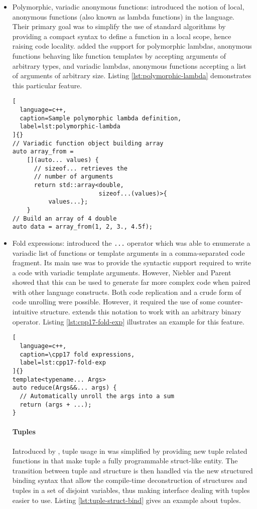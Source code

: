 \documentclass[../main]{subfiles}
\begin{document}
\begin{itemize}
\item
Polymorphic, variadic anonymous functions: 
introduced the notion of local, anonymous functions
(also known as lambda functions) in the language.
Their primary goal was to simplify the use of standard
algorithms by providing a compact syntax to define a
function in a local scope, hence raising code locality.
 added the support for polymorphic lambdas, \ie
anonymous functions behaving like function templates
by accepting arguments of arbitrary types, and variadic
lambdas, \ie anonymous functions accepting a list of
arguments of arbitrary size. Listing \ref{lst:polymorphic-lambda}
demonstrates this particular feature.

\begin{lstlisting}[
  language=c++,
  caption=Sample polymorphic lambda definition,
  label=lst:polymorphic-lambda
]{}
// Variadic function object building array
auto array_from =
    [](auto... values) {
      // sizeof... retrieves the
      // number of arguments
      return std::array<double,
                        sizeof...(values)>{
          values...};
    }
// Build an array of 4 double
auto data = array_from(1, 2, 3., 4.5f);
\end{lstlisting}

\item
Fold expressions:  introduced the \lstinline{...} operator
which was able to enumerate a variadic list of functions
or template arguments in a comma-separated code
fragment. Its main use was to provide the syntactic
support required to write a code with variadic template
arguments. However, Niebler and Parent showed that
this can be used to generate far more complex code
when paired with other language constructs. Both
code replication and a crude form of code unrolling
were possible. However, it required the use of some
counter-intuitive structure.  extends this notation
to work with an arbitrary binary operator.
Listing \ref{lst:cpp17-fold-exp} illustrates
an example for this feature.

\begin{lstlisting}[
  language=c++,
  caption=\cpp17 fold expressions,
  label=lst:cpp17-fold-exp
]{}
template<typename... Args>
auto reduce(Args&&... args) {
  // Automatically unroll the args into a sum
  return (args + ...);
}
\end{lstlisting}

\paragraph{Tuples} Introduced by , tuple usage in \cpp was
simplified by providing new tuple related functions in
 that make tuple a fully programmable struct-like
entity. The transition between tuple and structure is then
handled via the new structured binding syntax that allow
the compile-time deconstruction of structures and tuples
in a set of disjoint variables, thus making interface
dealing with tuples easier to use.
Listing \ref{lst:tuple-struct-bind} gives an
example about tuples.


\end{itemize}
\end{document}
